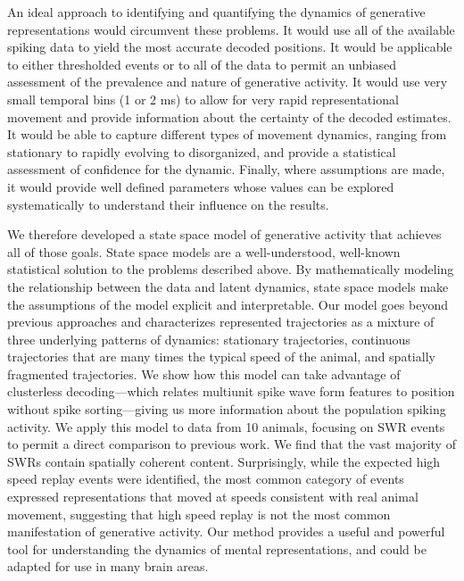 \documentclass[times, twoside]{zHenriquesLab-StyleBioRxiv}
\begin{document}
An ideal approach to identifying and quantifying the dynamics of generative representations would circumvent these problems. It would use all of the available spiking data to yield the most accurate decoded positions. It would be applicable to either thresholded events or to all of the data to permit an unbiased assessment of the prevalence and nature of generative activity. It would use very small temporal bins (1 or 2 ms) to allow for very rapid representational movement and provide information about the certainty of the decoded estimates. It would be able to capture different types of movement dynamics, ranging from stationary to rapidly evolving to disorganized, and provide a statistical assessment of confidence for the dynamic. Finally, where assumptions are made, it would provide well defined parameters whose values can be explored systematically to understand their influence on the results.

We therefore developed a state space model of generative activity that achieves all of those goals. State space models are a well-understood, well-known statistical solution to the problems described above. By mathematically modeling the relationship between the data and latent dynamics, state space models make the assumptions of the model explicit and interpretable. Our model goes beyond previous approaches \cite{MaboudiUncoveringtemporalstructure2018, DengRapidclassificationhippocampal2016} and characterizes represented trajectories as a mixture of three underlying patterns of dynamics: stationary trajectories, continuous trajectories that are many times the typical speed of the animal, and spatially fragmented trajectories. We show how this model can take advantage of clusterless decoding---which relates multiunit spike wave form features to position without spike sorting---giving us more information about the population spiking activity. We apply this model to data from 10 animals, focusing on SWR events to permit a direct comparison to previous work. We find that the vast majority of SWRs contain spatially coherent content. Surprisingly, while the expected high speed replay events were identified, the most common category of events expressed representations that moved at speeds consistent with real animal movement, suggesting that high speed replay is not the most common manifestation of generative activity. Our method provides a useful and powerful tool for understanding the dynamics of mental representations, and could be adapted for use in many brain areas. 
\end{document}
